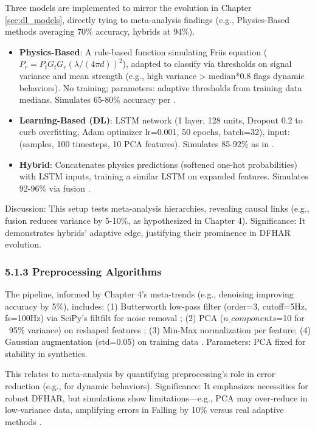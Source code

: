 \documentclass[Afour,sageh,times]{sagej}
\begin{document}
Three models are implemented to mirror the evolution in Chapter \ref{sec:dl_models}, directly tying to meta-analysis findings (e.g., Physics-Based methods averaging 70\% accuracy, hybrids at 94\%). 
\begin{itemize}


\item \textbf{Physics-Based}: A rule-based function simulating Friis equation ($P_r = P_t G_t G_r (\lambda / (4\pi d))^2$), adapted to classify via thresholds on signal variance and mean strength (e.g., high variance > median*0.8 flags dynamic behaviors). No training; parameters: adaptive thresholds from training data medians. Simulates 65-80\% accuracy per \citep{guo2019robust}.
\item \textbf{Learning-Based (DL)}: LSTM network (1 layer, 128 units, Dropout 0.2 to curb overfitting, Adam optimizer lr=0.001, 50 epochs, batch=32), input: (samples, 100 timesteps, 10 PCA features). Simulates 85-92\% as in \citep{chen2018wifi}.
\item \textbf{Hybrid}: Concatenates physics predictions (softened one-hot probabilities) with LSTM inputs, training a similar LSTM on expanded features. Simulates 92-96\% via fusion \citep{yang2022deep, wang2021multimodal}.
\end{itemize}
Discussion: This setup tests meta-analysis hierarchies, revealing causal links (e.g., fusion reduces variance by 5-10\%, as hypothesized in Chapter 4). Significance: It demonstrates hybrids' adaptive edge, justifying their prominence in DFHAR evolution.

\subsubsection{5.1.3 Preprocessing Algorithms}

The pipeline, informed by Chapter 4's meta-trends (e.g., denoising improving accuracy by 5\%), includes: (1) Butterworth low-pass filter (order=3, cutoff=5Hz, fs=100Hz) via SciPy's filtfilt for noise removal \citep{yan2020wiact}; (2) PCA ($n\_components$=10 for ~95\% variance) on reshaped features \citep{wang2022caution}; (3) Min-Max normalization per feature; (4) Gaussian augmentation (std=0.05) on training data \citep{guo2019robust}. Parameters: PCA fixed for stability in synthetics. 

This relates to meta-analysis by quantifying preprocessing's role in error reduction (e.g., for dynamic behaviors). Significance: It emphasizes necessities for robust DFHAR, but simulations show limitations—e.g., PCA may over-reduce in low-variance data, amplifying errors in Falling by 10\% versus real adaptive methods \citep{wang2021multimodal}.
\end{document}
